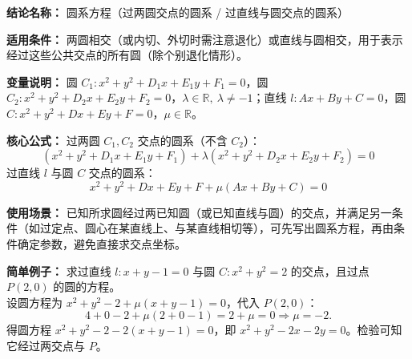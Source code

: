 \textbf{结论名称：} 圆系方程（过两圆交点的圆系 / 过直线与圆交点的圆系）

\textbf{适用条件：} 两圆相交（或内切、外切时需注意退化）或直线与圆相交，用于表示经过这些公共交点的所有圆（除个别退化情形）。

\textbf{变量说明：} 
圆 \(C_1: x^2+y^2+D_1x+E_1y+F_1=0\)，圆 \(C_2: x^2+y^2+D_2x+E_2y+F_2=0\)，\(\lambda\in\mathbb{R},\ \lambda\neq -1\)；直线 \(l: Ax+By+C=0\)，圆 \(C: x^2+y^2+Dx+Ey+F=0\)，\(\mu\in\mathbb{R}\)。

\textbf{核心公式：} 
过两圆 \(C_1,C_2\) 交点的圆系（不含 \(C_2\)）：
\[
\boxed{(x^2+y^2+D_1x+E_1y+F_1)+\lambda(x^2+y^2+D_2x+E_2y+F_2)=0}
\]
过直线 \(l\) 与圆 \(C\) 交点的圆系：
\[
\boxed{x^2+y^2+Dx+Ey+F+\mu(Ax+By+C)=0}
\]

\textbf{使用场景：} 已知所求圆经过两已知圆（或已知直线与圆）的交点，并满足另一条件（如过定点、圆心在某直线上、与某直线相切等），可先写出圆系方程，再由条件确定参数，避免直接求交点坐标。

\textbf{简单例子：} 
求过直线 \(l:x+y-1=0\) 与圆 \(C:x^2+y^2=2\) 的交点，且过点 \(P(2,0)\) 的圆的方程。\\
设圆方程为 \(x^2+y^2-2+\mu(x+y-1)=0\)，代入 \(P(2,0)\)：
\[
4+0-2+\mu(2+0-1)=2+\mu=0 \Rightarrow \mu=-2.
\]
得圆方程 \(x^2+y^2-2-2(x+y-1)=0\)，即 \(x^2+y^2-2x-2y=0\)。检验可知它经过两交点与 \(P\)。